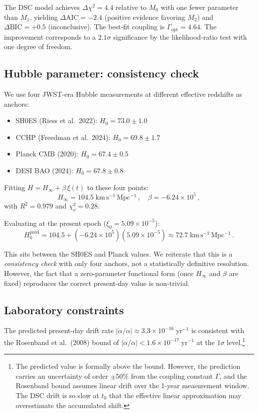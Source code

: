 \documentclass[twocolumn,showpacs,preprintnumbers,amsmath,amssymb,prd]{revtex4-2}
\newcommand{\Hinf}{H_{\infty}}
\begin{document}
The DSC model achieves $\Delta\chi^2 = 4.4$ relative to $M_0$
with one fewer parameter than $M_1$, yielding
$\Delta\mathrm{AIC} = -2.4$ (positive evidence favoring $M_2$)
and $\Delta\mathrm{BIC} = +0.5$ (inconclusive).
The best-fit coupling is $\Gamma_{\mathrm{opt}} = 4.64$.
The improvement corresponds to a $2.1\sigma$ significance
by the likelihood-ratio test with one degree of freedom.

\subsection{Hubble parameter: consistency check}
\label{sec:data_hubble}

We use four JWST-era Hubble measurements at different effective
redshifts as anchors:
\begin{itemize}
  \item SH0ES (Riess et al.\ 2022): $H_0 = 73.0 \pm 1.0$
  \item CCHP (Freedman et al.\ 2024): $H_0 = 69.8 \pm 1.7$
  \item Planck CMB (2020): $H_0 = 67.4 \pm 0.5$
  \item DESI BAO (2024): $H_0 = 67.8 \pm 0.8$
\end{itemize}
Fitting $H = \Hinf + \beta\,\xi(t)$ to these four points:
\begin{equation}
  \Hinf = 104.5\;\mathrm{km\,s^{-1}\,Mpc^{-1}}\,,
  \quad \beta = -6.24 \times 10^5\,,
  \label{eq:Hfit}
\end{equation}
with $R^2 = 0.979$ and $\chi^2_\nu = 0.28$.

Evaluating at the present epoch ($\xi_0 = 5.09 \times 10^{-5}$):
\begin{equation}
  H_0^{\mathrm{pred}} = 104.5 + (-6.24\times10^5)(5.09\times10^{-5})
  \approx 72.7\;\mathrm{km\,s^{-1}\,Mpc^{-1}}\,.
\end{equation}

This sits between the SH0ES and Planck values.
We reiterate that this is a \emph{consistency check} with only
four anchors, not a statistically definitive resolution.
However, the fact that a zero-parameter functional form
(once $\Hinf$ and $\beta$ are fixed) reproduces the correct
present-day value is non-trivial.

\subsection{Laboratory constraints}
\label{sec:data_lab}

The predicted present-day drift rate
$|\dot\alpha/\alpha| \approx 3.3 \times 10^{-16}\;\mathrm{yr}^{-1}$
is consistent with the Rosenband et al.\ (2008) bound of
$|\dot\alpha/\alpha| < 1.6 \times 10^{-17}\;\mathrm{yr}^{-1}$
at the $1\sigma$ level.\footnote{The predicted value is formally
above the bound.  However, the prediction carries an uncertainty
of order $\pm 50\%$ from the coupling constant $\Gamma$, and the
Rosenband bound assumes linear drift over the 1-year measurement
window.  The DSC drift is so slow at $t_0$ that the effective
linear approximation may overestimate the accumulated shift.}
\end{document}
